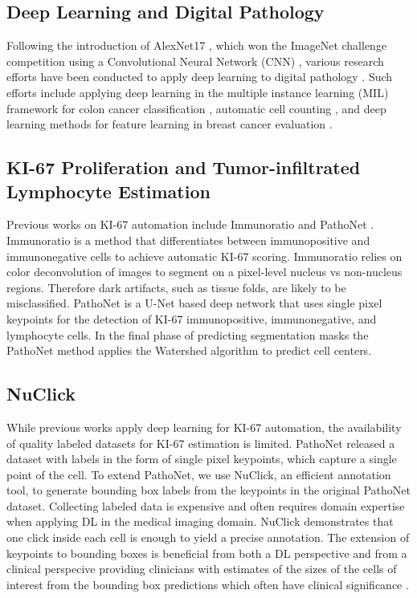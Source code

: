 \documentclass[runningheads]{llncs}
\begin{document}
\subsection{Deep Learning and Digital Pathology}

Following the introduction of AlexNet17 \cite{hinton2012imagenet}, which won the ImageNet challenge \cite{5206848} competition using a Convolutional Neural Network (CNN) \cite{lecun1995convolutional}, various research efforts have been conducted to apply deep learning to digital pathology \cite{madabhushi2016image}. Such efforts include applying deep learning in the multiple instance learning (MIL) framework for colon cancer classification \cite{xu2014deep}, automatic cell counting \cite{xie2018microscopy}, and deep learning methods for feature learning in breast cancer evaluation \cite{spanhol2016breast}.


\subsection{KI-67 Proliferation and Tumor-infiltrated Lymphocyte Estimation}
Previous works on KI-67 automation include Immunoratio \cite{tuominen2010immunoratio} and PathoNet \cite{negahbani2021pathonet}. Immunoratio is a method that differentiates between immunopositive and immunonegative cells to achieve automatic KI-67 scoring. Immunoratio relies on color deconvolution of images to segment on a pixel-level nucleus vs non-nucleus regions. Therefore dark artifacts, such as tissue folds, are likely to be misclassified. PathoNet is a U-Net \cite{DBLP:journals/corr/RonnebergerFB15} based deep network that uses single pixel keypoints for the detection of KI-67 immunopositive, immunonegative, and lymphocyte cells. In the final phase of predicting segmentation masks the PathoNet method applies the Watershed \cite{kornilov2018overview} algorithm to predict cell centers.

\subsection{NuClick}
While previous works apply deep learning for KI-67 automation, the availability of quality labeled datasets for KI-67 estimation is limited. PathoNet released a dataset with labels in the form of single pixel keypoints, which capture a single point of the cell. To extend PathoNet, we use NuClick, an efficient annotation tool, to generate bounding box labels from the keypoints in the original PathoNet dataset. Collecting labeled data is expensive and often requires domain expertise when applying DL in the medical imaging domain. NuClick demonstrates that one click inside each cell is enough to yield a precise annotation. The extension of keypoints to bounding boxes is beneficial from both a DL perspective and from a clinical perspecive providing clinicians with estimates of the sizes of the cells of interest from the bounding box predictions which often have clinical significance \cite{schob2018whole}.
\end{document}

